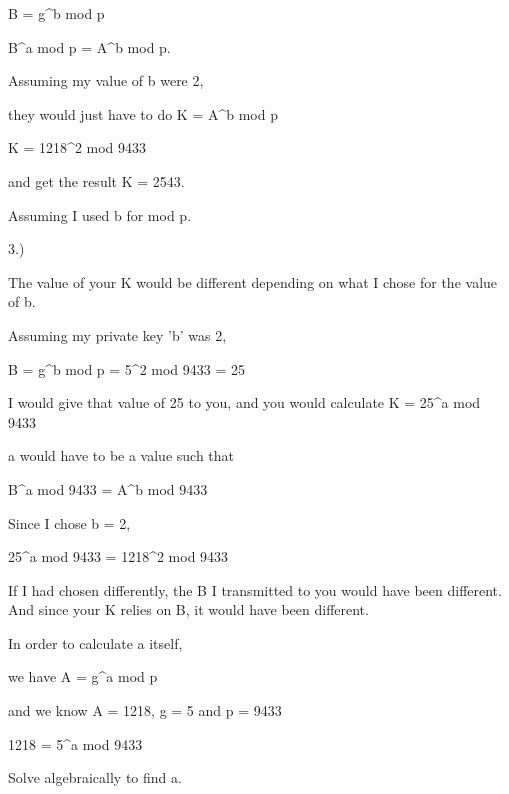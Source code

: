 B = g^b mod p 

B^a mod p = A^b mod p.

Assuming my value of b were 2,

they would just have to do K = A^b mod p

K = 1218^2 mod 9433

and get the result K = 2543.

Assuming I used b for mod p.

3.)

The value of your K would be different depending on what I chose for the value of b.

Assuming my private key 'b' was 2,

B = g^b mod p
= 5^2 mod 9433 = 25

I would give that value of 25 to you, and you would calculate K = 25^a mod 9433

a would have to be a value such that 

B^a mod 9433 = A^b mod 9433

Since I chose b = 2,

25^a mod 9433 = 1218^2 mod 9433

If I had  chosen differently, the B I transmitted to you would have been different. And since your K relies on B, it would have been different.

In order to calculate a itself,

we have A = g^a mod p

and we know A = 1218, g = 5 and p = 9433

1218 = 5^a mod 9433

Solve algebraically to find a.






